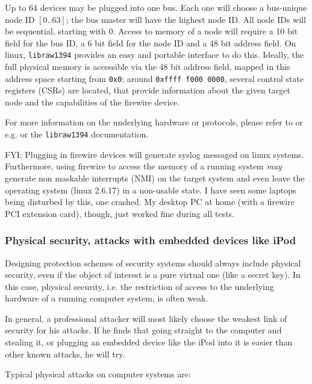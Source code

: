Up to 64 devices may be plugged into one bus. Each one will choose a bus-unique
node ID $[0..63]$; the bus master will have the highest node ID. All node IDs
will be sequential, starting with 0. Access to memory of a node will require a
10 bit field for the bus ID, a 6 bit field for the node ID and a 48 bit address
field.  On linux, \texttt{libraw1394} provides an easy and portable interface to
do this. Ideally, the full physical memory is accessible via the 48 bit address
field, mapped in this address space starting from \texttt{0x0}; around
\texttt{0xffff~f000~0000}, several control state registers (CSRs) are located,
that provide information about the given target node and the capabilities of the
firewire device.

For more information on the underlying hardware or protocols, please refer to
\cite{OHCIspecs:2000} or e.g. \cite{fwire_sys_arch:2222} or the
\texttt{libraw1394} documentation.

FYI: Plugging in firewire devices will generate syslog messaged on linux
systems. Furthermore, using firewire to access the memory of a running system
\emph{may} generate non maskable interrupts (NMI) on the target system and even
leave the operating system (linux 2.6.17) in a non-usable state. I have seen
some laptops being disturbed by this, one crashed. My desktop PC at home (with a
firewire PCI extension card), though, just worked fine during all tests.



\subsubsection{Physical security, attacks with embedded devices like iPod}

Designing protection schemes of security systems should always include physical
security, even if the object of interest is a pure virtual one (like a secret
key). In this case, physical security, i.e. the restriction of access to the
underlying hardware of a running computer system, is often weak.

In general, a professional attacker will most likely choose the weakest link of
security for his attacks. If he finds that going straight to the computer and
stealing it, or plugging an embedded device like the iPod into it is easier than
other known attacks, he will try.

Typical physical attacks on computer systems are:

